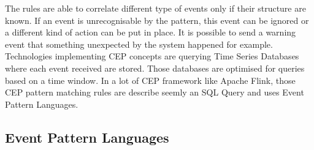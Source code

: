 \documentclass[11pt]{article}
\begin{document}
The rules are able to correlate different type of events only if their structure are known. If an event is unrecognisable by the pattern, this event can be ignored or a different kind of action can be put in place. It is possible to send a warning event that something unexpected by the system happened for example. 
\newline
\newline
Technologies implementing CEP concepts are querying Time Series Databases where each event received are stored. Those databases are optimised for queries based on a time window. In a lot of CEP framework like Apache Flink, those CEP pattern matching rules are describe seemly an SQL Query and uses Event Pattern Languages. 

\subsection{Event Pattern Languages}
\end{document}
